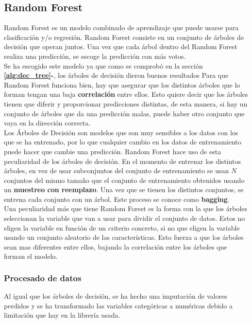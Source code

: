 \subsection{Random Forest}
\label{sec:rf}
Random Forest es un modelo  combinado de aprendizaje que puede usarse para clasificación y/o regresión. Random Forest consiste en un conjunto de árboles de decisión que operan juntos. Una vez que cada árbol dentro del Random Forest realiza una predicción, se escoge la predicción con más votos. \\ Se ha escogido este modelo ya que como se comprobó en la sección \textbf{\ref{alg:dec_tree}-}, los árboles de decisión dieron buenos resultados
\linebreak
Para que Random Forest funciona bien, hay que asegurar que los distintos árboles que lo forman tengan una baja \textbf{correlación} entre ellos. Esto quiere decir que los árboles tienen que diferir y proporcionar predicciones distintas, de esta manera, si hay un conjunto de  árboles que da una predicción malas, puede haber otro conjunto que vaya en la dirección correcta. \\
\linebreak
Los Árboles de Decisión son modelos que son muy sensibles a los datos con los que se ha entrenado, por lo que cualquier cambio en los datos de entrenamiento puede hacer que cambie una predicción. Random Forest hace uso de esta peculiaridad de los árboles de decisión.
En el momento de entrenar los distintos árboles, en vez de usar subconjuntos del conjunto de entrenamiento se usan $N$ conjuntos del mismo tamaño que el conjunto de entrenamiento obtenidos usando un \textbf{muestreo con reemplazo}. Una vez que se tienen los distintos conjuntos, se entrena cada conjunto con un árbol. Este proceso se conoce como \textbf{bagging}.\\
\linebreak
Una peculiaridad más que tiene Random Forest es la forma con la que los árboles seleccionan la variable que van a usar para dividir el conjunto de datos. Estos no eligen la variable en función de un criterio concreto, si no que eligen la variable usando un conjunto aleatorio de las características.  Esto fuerza a que los árboles sean mas diferentes entre ellos, bajando la correlación entre los árboles que forman el modelo.
\subsubsection*{Procesado de datos}
Al igual que los árboles de decisión, se ha hecho una imputación de valores perdidos y se ha transformado las variables categóricas a numéricas debido a limitación que hay en la librería usada.
\pagebreak
